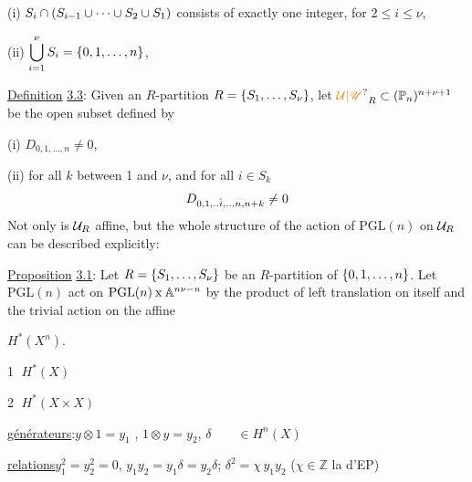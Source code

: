(i) $S_i\cap(S_{i-1}\cup\cdots\cup S_2\cup S_1)$ consists of exactly one
integer, for $2\leq i\leq\nu$,

(ii) $\displaystyle\bigcup_{i=1}^{\nu}S_i=\{0,1,\ldots,n\}$,

\uline{Definition} \uline{3.3}: Given an $R$-partition $R=\{S_1,\ldots,S_\nu\}$, let
$\handwritten{\unsure{\mathcal{U}|\mathscr{U}}}_R\handwritten{\subset}(\handwritten{\mathbb{P}}_n)^{n+\nu+1}$ be the open subset defined by

(i) $D_{0,1,\ldots,n}\ne 0$,

(ii) for all $k$ between 1 and $\nu$, and for all $i\in S_k$
\[
 D_{0,1,..\hat{i},..,n,n+k}\ne 0
\]
Not only is $\mathcal{U}_R$ affine, but the whole structure of the action
of $\mathrm{PGL}(n)$ on $\mathcal{U}_R$ can be described explicitly:

\uline{Proposition} \uline{3.1}: Let $R=\{S_1,\ldots,S_\nu\}$ be an $R$-partition of
$\{0,1,\ldots,n\}$. Let $\mathrm{PGL}(n)$ act on $\mathrm{PGL}(n)\mathbin{\mathrm{x}}\mathbb{A}^{n\nu-n}$ by the product
of left translation on itself and the trivial action on the affine

   $H^*(X^n)$.

\textcircled{1} \uline{$H^*(X)$}\qquad{}


\textcircled{2} \uline{$H^*(X\times X)$}

\uline{générateurs}:\qquad $y\otimes1=y_1$ , $1\otimes y=y_2$, $\delta\qquad\in H^n(X)$

\uline{relations}\qquad $y_1^2=y_2^2=0$, $y_1y_2=y_1\delta=y_2\delta$; $\delta^2=\chi\,y_1y_2$\qquad
($\chi\in\mathbb{Z}$ la  d'EP)


